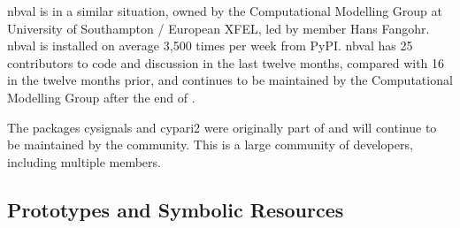 \documentclass{deliverablereport}
\begin{document}
nbval is in a similar situation,
owned by the Computational Modelling Group at University of Southampton / European XFEL,
led by \ODK member Hans Fangohr.
nbval is installed on average 3,500 times per week from PyPI.
nbval has 25 contributors to code and discussion in the last twelve months,
compared with 16 in the twelve months prior,
and continues to be maintained by the Computational Modelling Group after the end of \ODK.

The packages cysignals and cypari2 were originally part of \Sage
and will continue to be maintained by the \Sage community.
This is a large community of developers, including multiple \ODK members.

  \subsection{Prototypes and Symbolic Resources}
\end{document}
